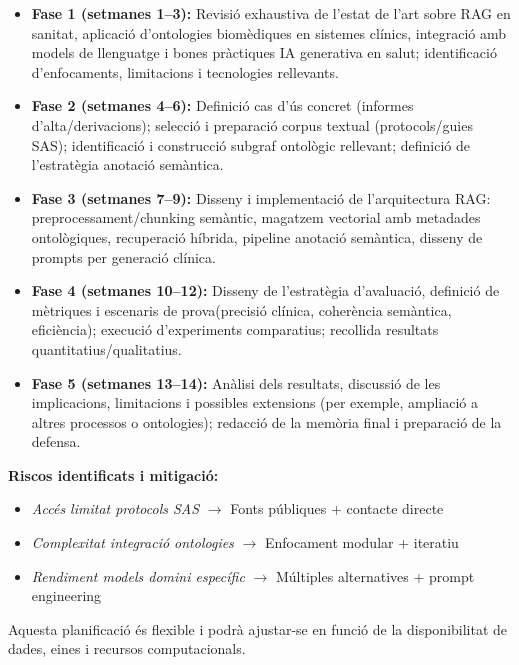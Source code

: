 \documentclass[11pt,a4paper]{article}
\begin{document}
\begin{itemize}
    \item \textbf{Fase 1 (setmanes 1--3):}
    Revisió exhaustiva de l'estat de l'art sobre RAG en sanitat, aplicació d'ontologies biomèdiques en sistemes clínics, integració amb models de llenguatge i bones pràctiques IA generativa en salut; identificació d'enfocaments, limitacions i tecnologies rellevants.
    
    
    \item \textbf{Fase 2 (setmanes 4--6):} Definició cas d'ús concret (informes d'alta/derivacions); selecció i preparació corpus textual (protocols/guies SAS); identificació i construcció subgraf ontològic rellevant; definició de l'estratègia anotació semàntica.

    \item \textbf{Fase 3 (setmanes 7--9):} Disseny i implementació de l'arquitectura RAG: preprocessament/chunking semàntic, magatzem vectorial amb metadades ontològiques, recuperació híbrida, pipeline anotació semàntica, disseny de prompts per generació clínica.
      
    \item \textbf{Fase 4 (setmanes 10--12):} Disseny de l'estratègia d'avaluació, definició de mètriques i escenaris de prova(precisió clínica, coherència semàntica, eficiència); execució d'experiments comparatius; recollida resultats quantitatius/qualitatius.
    
    \item \textbf{Fase 5 (setmanes 13--14):} Anàlisi dels resultats, discussió de les implicacions, limitacions i possibles extensions (per exemple, ampliació a altres processos o ontologies); redacció de la memòria final i preparació de la defensa.
  
\end{itemize}

\textbf{Riscos identificats i mitigació:}
\begin{itemize}
\item \textit{Accés limitat protocols SAS} $\to$ Fonts públiques + contacte directe
\item \textit{Complexitat integració ontologies} $\to$ Enfocament modular + iteratiu
\item \textit{Rendiment models domini específic} $\to$ Múltiples alternatives + prompt engineering
\end{itemize}

Aquesta planificació és flexible i podrà ajustar-se en funció de la disponibilitat de dades, eines i recursos computacionals.
\end{document}
